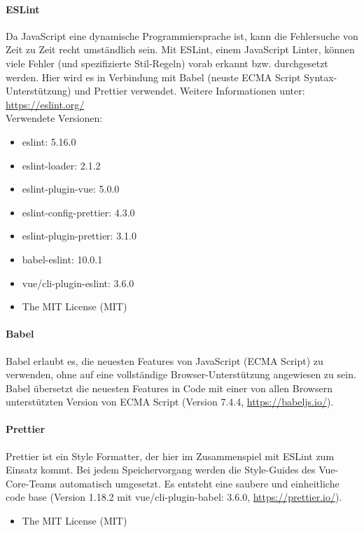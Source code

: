 	\paragraph{ESLint}
	Da JavaScript eine dynamische Programmiersprache ist, kann die Fehlersuche von Zeit zu Zeit recht umständlich sein.
Mit ESLint, einem JavaScript Linter, können viele Fehler (und spezifizierte Stil-Regeln) vorab erkannt bzw. durchgesetzt werden. Hier wird es in Verbindung mit Babel (neuste ECMA Script Syntax-Unterstützung) und Prettier verwendet. Weitere Informationen unter: \url{https://eslint.org/}\\
Verwendete Versionen:
	\begin{itemize}
		\item eslint: 5.16.0
		\item eslint-loader: 2.1.2
		\item eslint-plugin-vue: 5.0.0
		\item eslint-config-prettier: 4.3.0
		\item eslint-plugin-prettier: 3.1.0
		\item babel-eslint: 10.0.1
		\item vue/cli-plugin-eslint: 3.6.0
		\item The MIT License (MIT)
	\end{itemize}

	\paragraph{Babel}
	Babel erlaubt es, die neuesten Features von JavaScript (ECMA Script) zu verwenden, ohne auf eine vollständige Browser-Unterstützung angewiesen zu sein. Babel übersetzt die neuesten Features in Code mit einer von allen Browsern unterstützten Version von ECMA Script (Version 7.4.4, \url{https://babeljs.io/}).
	
	\paragraph{Prettier}
	Prettier ist ein Style Formatter, der hier im Zusammenspiel mit ESLint zum Einsatz kommt. Bei jedem Speichervorgang werden die Style-Guides des Vue-Core-Teams automatisch umgesetzt. Es entsteht eine saubere und einheitliche code base (Version 1.18.2 mit vue/cli-plugin-babel: 3.6.0, \url{https://prettier.io/}).
	
	\begin{itemize}
		\item The MIT License (MIT)
	\end{itemize}
	

